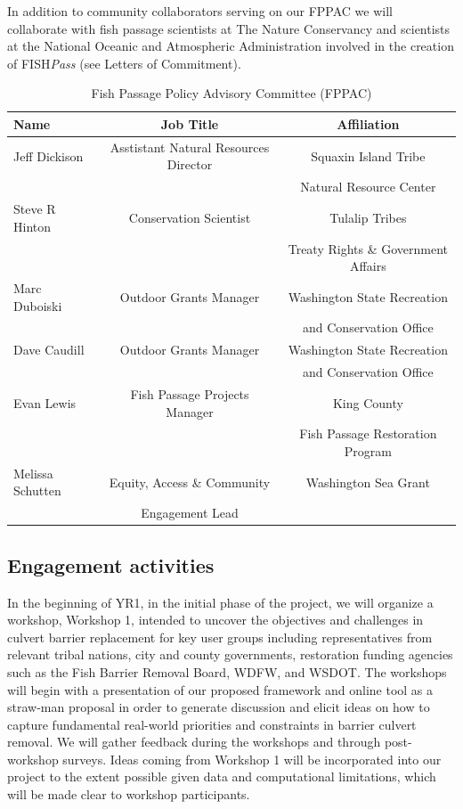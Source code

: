 \documentclass[12pt]{elsarticle}
\begin{document}
In addition to community collaborators serving on our FPPAC we will collaborate with fish passage scientists at The Nature Conservancy and scientists at the National Oceanic and Atmospheric Administration involved in the creation of FISH\emph{Pass} (see Letters of Commitment).

\begin{table}[h]
\caption{Fish Passage Policy Advisory Committee (FPPAC) \label{tab:sab}}
\centering
\begin{tabular}{lcc}\hline
 Name & Job Title & Affiliation  \\\hline
Jeff Dickison& Asstistant Natural Resources Director &  Squaxin Island Tribe\\
& & Natural Resource Center\\
\rowcolor[gray]{.9} Steve R Hinton &  Conservation Scientist&  Tulalip Tribes  \\
\rowcolor[gray]{.9}& &Treaty Rights \& Government Affairs\\
Marc Duboiski & Outdoor Grants Manager & Washington State Recreation\\
& & and Conservation Office\\
\rowcolor[gray]{.9}Dave Caudill & Outdoor Grants Manager & Washington State Recreation\\
\rowcolor[gray]{.9}& & and Conservation Office\\
Evan Lewis &  Fish Passage Projects Manager&  King County  \\
& & Fish Passage Restoration Program\\
\rowcolor[gray]{.9}Melissa Schutten & Equity, Access \& Community  & Washington Sea Grant \\
\rowcolor[gray]{.9}& Engagement Lead & \\
\hline
\end{tabular}
\end{table}

\subsection*{Engagement activities}

In the beginning of YR1, in the initial phase of the project, we will organize a workshop, Workshop 1, intended to uncover the objectives and challenges in culvert barrier replacement for key user groups including representatives from relevant tribal nations, city and county governments, restoration funding agencies such as the Fish Barrier Removal Board, WDFW, and WSDOT. The workshops will begin with a presentation of our proposed framework and online tool as a straw-man proposal in order to generate discussion and elicit ideas on how to capture fundamental real-world priorities and constraints in barrier culvert removal. We will gather feedback during the workshops and through post-workshop surveys. Ideas coming from Workshop 1 will be incorporated into our project to the extent possible given data and computational limitations, which will be made clear to workshop participants.
\end{document}
